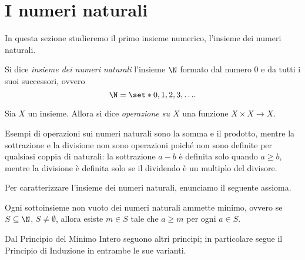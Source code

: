 \section{I numeri naturali}

In questa sezione studieremo il primo insieme numerico, l'insieme dei numeri naturali.

\begin{definition}
    Si dice \emph{insieme dei numeri naturali} l'insieme $\N$ formato dal numero $0$ e da tutti i suoi successori, ovvero \begin{equation}
        \N = \set*{0, 1, 2, 3, \dots}.
    \end{equation}
\end{definition}

\begin{definition}
     Sia $X$ un insieme. Allora si dice \emph{operazione su $X$} una funzione $X \times X \to X$.
\end{definition}

Esempi di operazioni sui numeri naturali sono la somma e il prodotto, mentre la sottrazione e la divisione non sono operazioni poiché non sono definite per qualsiasi coppia di naturali: la sottrazione $a - b$ è definita solo quando $a \geq b$, mentre la divisione è definita solo se il dividendo è un multiplo del divisore.

Per caratterizzare l'insieme dei numeri naturali, enunciamo il seguente assioma.

\begin{axiom}
     \label{ax:min_intero} Ogni sottoinsieme non vuoto dei numeri naturali ammette minimo, ovvero se $S \subseteq \N$, $S \neq \emptyset$, allora esiste $m \in S$ tale che $a \geq m$ per ogni $a \in S$.
\end{axiom}

Dal Principio del Minimo Intero seguono altri principi; in particolare segue il Principio di Induzione in entrambe le sue varianti.

